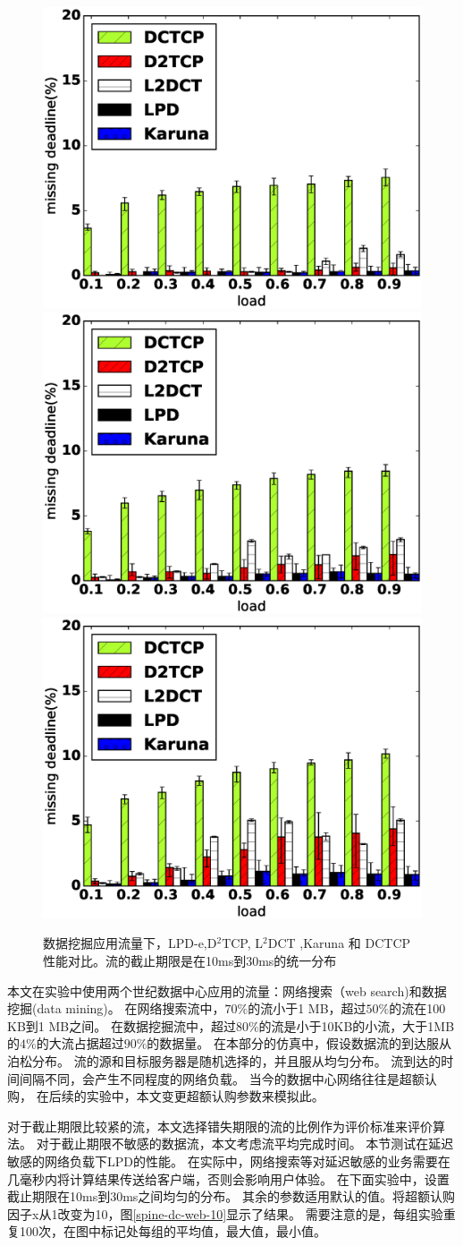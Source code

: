 \begin{figure}[h]
\centering
{}
 {\includegraphics[width=0.32\columnwidth]{figures/LPD/spineleaf/miss_deadline_4.eps}}
{\includegraphics[width=0.32\columnwidth]{figures/LPD/spineleaf/miss_deadline_6.eps}}
{\includegraphics[width=0.32\columnwidth]{figures/LPD/spineleaf/miss_deadline_9.eps}}
\caption{数据挖掘应用流量下，LPD-e,D$^2$TCP, L$^2$DCT ,Karuna 和 DCTCP性能对比。流的截止期限是在10ms到30ms的统一分布}
\label{miss-spine-data-fig}
\end{figure}


本文在实验中使用两个世纪数据中心应用的流量：网络搜索（web search)和数据挖掘(data mining)\cite{DCTCP,pFabric}。
在网络搜索流中，$70\%$的流小于1 MB，超过$50\%$的流在100 KB到1 MB之间。
在数据挖掘流中，超过$80\%$的流是小于10KB的小流，大于1MB的$4\%$的大流占据超过$90\%$的数据量。
在本部分的仿真中，假设数据流的到达服从泊松分布。 
流的源和目标服务器是随机选择的，并且服从均匀分布。
流到达的时间间隔不同，会产生不同程度的网络负载。
当今的数据中心网络往往是超额认购\cite{CloudMirror}，
在后续的实验中，本文变更超额认购参数来模拟此。






对于截止期限比较紧的流，本文选择错失期限的流的比例作为评价标准来评价算法。
对于截止期限不敏感的数据流，本文考虑流平均完成时间。
本节测试在延迟敏感的网络负载下LPD的性能。
在实际中，网络搜索等对延迟敏感的业务需要在几毫秒内将计算结果传送给客户端，否则会影响用户体验。
在下面实验中，设置截止期限在10ms到30ms之间均匀的分布。
其余的参数适用默认的值。将超额认购因子x从1改变为10，图\ref{spine-dc-web-10}显示了结果。
需要注意的是，每组实验重复100次，在图中标记处每组的平均值，最大值，最小值。



